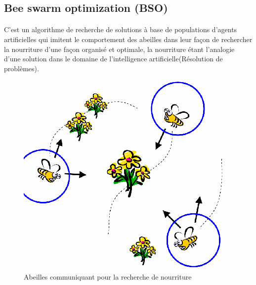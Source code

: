 		\subsection{Bee swarm optimization (BSO)}
		\paragraph{} 
		C'est un algorithme de recherche de solutions à base de populations d'agents artificielles qui imitent le comportement des abeilles dans leur façon de rechercher la nourriture d'une façon organisé et optimale, la nourriture étant l'analogie d'une solution dans le domaine de l'intelligence artificielle(Résolution de problèmes).\cite{Drias}
		\begin{figure}[H]
			\centering
			\includegraphics{images/beesSearching.png}
			\caption{Abeilles communiquant pour la recherche de nourriture}
		\end{figure}
		
		